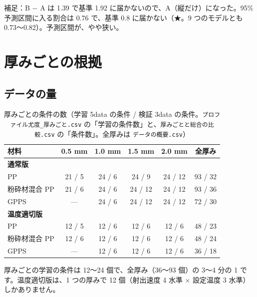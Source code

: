 \documentclass[paper=a4paper,fontsize=10.5pt,line_length=44zw,number_of_lines=40]{jlreq}
\let\origtextbf\textbf
\renewcommand{\textbf}[1]{\origtextbf{\gtfamily #1}}   %
\begin{document}
補足：B − A は 1.39 で基準 1.92 に届かないので、A（縦だけ）になった。95\% 予測区間に入る割合は 0.76 で、基準 0.8 に届かない（★。9 つのモデルとも 0.73〜0.82）。予測区間が、やや狭い。

\section{厚みごとの根拠}\label{sec:thick}
\subsection{データの量}
\begin{table}[H]\centering\small
\caption{厚みごとの条件の数（学習 5data の条件 / 検証 3data の条件。\texttt{プロファイル尤度\_\allowbreak{}厚みごと.csv} の「学習の条件数」と、\texttt{厚みごとと総合の比較.csv} の「条件数」。全厚みは \texttt{データの概要.csv}）}\label{tab:datah}
\begin{tabular}{lccccc}
\toprule
材料 & 0.5 mm & 1.0 mm & 1.5 mm & 2.0 mm & 全厚み \\
\midrule
\multicolumn{6}{l}{\textbf{通常版}} \\
PP & 21 / 5 & 24 / 6 & 24 / 9 & 24 / 12 & 93 / 32 \\
粉砕材混合 PP & 21 / 6 & 24 / 6 & 24 / 12 & 24 / 12 & 93 / 36 \\
GPPS & --- & 24 / 6 & 24 / 12 & 24 / 12 & 72 / 30 \\
\midrule
\multicolumn{6}{l}{\textbf{温度適切版}} \\
PP & 12 / 5 & 12 / 6 & 12 / 6 & 12 / 6 & 48 / 23 \\
粉砕材混合 PP & 12 / 6 & 12 / 6 & 12 / 6 & 12 / 6 & 48 / 24 \\
GPPS & --- & 12 / 6 & 12 / 6 & 12 / 6 & 36 / 18 \\
\bottomrule
\end{tabular}
\end{table}
厚みごとの学習の条件は 12〜24 個で、全厚み（36〜93 個）の 3〜4 分の 1 です。温度適切版は、1 つの厚みで 12 個（射出速度 4 水準 × 設定温度 3 水準）しかありません。
\end{document}
